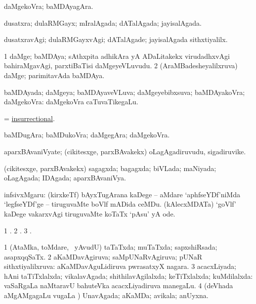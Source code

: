 \bentry
{}
\gl{\nA}
\bmng
daMgekoVra; baMDAyagAra. 
\emng
\eentry

\bentry
{}
\gl{\gu}
\bmng
dusatxra; dulaRMGayx; mIralAgada; dATalAgada; jayisalAgada. 
\emng
\eentry

\bentry
{}
\gl{\kirxvi}
\bmng
dusatxravAgi; dulaRMGayxvAgi; dATalAgade; jayisalAgada sithxtiyalilx. 
\emng
\eentry

\bentry
{}
\gl{\nA}
\bmng
\bnum
\num{1} daMge; baMDAya; sAthxpita adhikAra yA ADaLitakekx virudadhxvAgi bahiraMgavAgi, parxtiBaTisi daMgeyeVLuvudu. 
\num{2} (AraMBadesheyalilxruva) daMge; parimitavAda baMDAya. 
\enum
\emng
\eentry

\bentry
{}
\gl{\gu}
\bmng
baMDAyada; daMgeya; baMDAyaveVLuva; daMgeyebibxsuva; baMDAyakoVra; daMgekoVra:  daMgekoVra caTuvaTikegaLu. 
\emng
\eentry

\bentry
{}
\gl{\gu}
\bmng
= \hyperlink{insurrectional}{insurrectional}. 
\emng
\eentry

\bentry
{}
\gl{\nA}
\bmng
baMDugAra; baMDukoVra; daMgegAra; daMgekoVra. 
\emng
\eentry

\bentry
{}
\gl{\nA}
\bmng
aparxBAvaniVyate; (cikitesxge, parxBAvakekx) oLagAgadiruvudu, sigadiruvike. 
\emng
\eentry

\bentry
{}
\gl{\gu}
\bmng
(cikitesxge, parxBAvakekx) sagagxda; bagagxda; biVLada; maNiyada; oLagAgada; IDAgada; aparxBAvaniVya. 
\emng
\eentry

\bentry
{}
\gl{\nA}
\bmng
infsivxMgaru: 
\banum
{} (kirxkeTf) bAyxTugArana kaDege -- aMdare `aphfseYDf'niMda `legfseYDf'ge -- tiruguvaMte boVlf mADida ceMDu. 
 (kAlecxMDATa) `goVlf' kaDege vakarxvAgi tiruguvaMte koTaTx `pAsu' yA ode. 
\eanum
\emng
\eentry

\bentry
{}
\gl{\saMkiSx}
\bmng
\bnum
\num{1} . 
\num{2} . 
\num{3} . 
\enum
\emng
\eentry

\bentry
{}
\gl{\gu}
\bmng
\bnum
\num{1} (AtaMka, toMdare, \mo\ yAvudU) taTaTxda; muTaTxda; sapxshiRsada; asapxqqSaTx. 
\num{2} aKaMDavAgiruva; saMpUNaRvAgiruva; pUNaR sithxtiyalilxruva:  aKaMDavAguLidiruva pwrasatxyX nagara. 
\num{3} acacxLiyada; hAni taTiTxlalxda; vikalavAgada; shithilavAgilalxda; keTiTxlalxda; kuMdilalxda:  vaSaRgaLa naMtaravU bahuteVka acacxLiyadiruva manegaLu. 
\num{4} (deVhada aMgAMgagaLu \mo vugaLa \vi) UnavAgada; aKaMDa; avikala; anUyxna. 
\enum
\emng
\eentry

